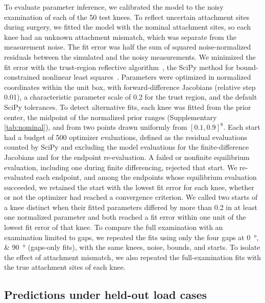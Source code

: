 To evaluate parameter inference, we calibrated the model to the noisy examination of each of the 50 test knees.
To reflect uncertain attachment sites during surgery, we fitted the model with the nominal attachment sites, so each knee had an unknown attachment mismatch, which was separate from the measurement noise.
The fit error was half the sum of squared noise-normalized residuals between the simulated and the noisy measurements.
We minimized the fit error with the trust-region reflective algorithm~\autocite{branch1999subspace}, the SciPy method for bound-constrained nonlinear least squares~\autocite{virtanen2020scipy}.
Parameters were optimized in normalized coordinates within the unit box, with forward-difference Jacobians (relative step 0.01), a characteristic parameter scale of 0.2 for the trust region, and the default SciPy tolerances.
To detect alternative fits, each knee was fitted from the prior center, the midpoint of the normalized prior ranges (Supplementary \autoref{tab:nominal}), and from two points drawn uniformly from $[0.1, 0.9]^8$.
Each start had a budget of 500 optimizer evaluations, defined as the residual evaluations counted by SciPy and excluding the model evaluations for the finite-difference Jacobians and for the endpoint re-evaluation.
A failed or nonfinite equilibrium evaluation, including one during finite differencing, rejected that start.
We re-evaluated each endpoint, and among the endpoints whose equilibrium evaluation succeeded, we retained the start with the lowest fit error for each knee, whether or not the optimizer had reached a convergence criterion.
We called two starts of a knee distinct when their fitted parameters differed by more than 0.2 in at least one normalized parameter and both reached a fit error within one unit of the lowest fit error of that knee.
To compare the full examination with an examination limited to gaps, we repeated the fits using only the four gaps at \SIlist{0;90}{\degree} (gaps-only fits), with the same knees, noise, bounds, and starts.
To isolate the effect of attachment mismatch, we also repeated the full-examination fits with the true attachment sites of each knee.

\subsection{Predictions under held-out load cases}

